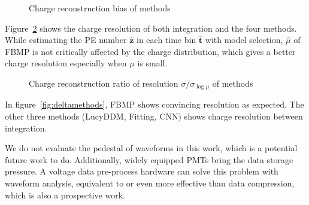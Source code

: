 \begin{figure}[H]
    \centering
    \resizebox{\textwidth}{!}{}
    \caption{\label{fig:biasmu} Charge reconstruction bias of methods}
\end{figure}

Figure~\ref{fig:deltamu} shows the charge resolution of both integration and the four methods. While estimating the PE number $\hat{\bm{z}}$ in each time bin $\hat{\bm{t}}$ with model selection, $\hat{\mu}$ of FBMP is not critically affected by the charge distribution, which gives a better charge resolution especially when $\mu$ is small. 

\begin{figure}[H]
    \centering
    \resizebox{\textwidth}{!}{}
    \caption{\label{fig:deltamu} Charge reconstruction ratio of resolution $\sigma/\sigma_{\log\mu}$ of methods}
\end{figure}

In figure~\ref{fig:deltamethods}, FBMP shows convincing resolution as expected. The other three methods (LucyDDM, Fitting, CNN) shows charge resolution between integration. 


We do not evaluate the pedestal of waveforms in this work, which is a potential future work to do. Additionally, widely equipped PMTs bring the data storage pressure. A voltage data pre-process hardware can solve this problem with waveform analysis, equivalent to or even more effective than data compression, which is also a prospective work. 
